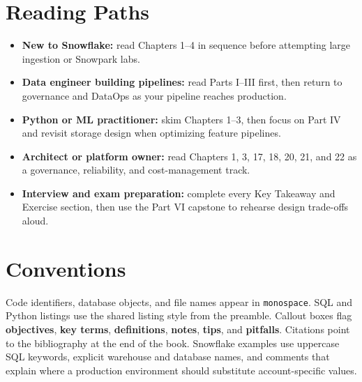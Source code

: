\section*{Reading Paths}
\begin{itemize}
    \item \textbf{New to Snowflake:} read Chapters 1--4 in sequence before attempting large ingestion or Snowpark labs.
    \item \textbf{Data engineer building pipelines:} read Parts I--III first, then return to governance and DataOps as your pipeline reaches production.
    \item \textbf{Python or ML practitioner:} skim Chapters 1--3, then focus on Part IV and revisit storage design when optimizing feature pipelines.
    \item \textbf{Architect or platform owner:} read Chapters 1, 3, 17, 18, 20, 21, and 22 as a governance, reliability, and cost-management track.
    \item \textbf{Interview and exam preparation:} complete every Key Takeaway and Exercise section, then use the Part VI capstone to rehearse design trade-offs aloud.
\end{itemize}

\section*{Conventions}
Code identifiers, database objects, and file names appear in \texttt{monospace}. SQL and Python listings use the shared listing style from the preamble. Callout boxes flag \textbf{objectives}, \textbf{key terms}, \textbf{definitions}, \textbf{notes}, \textbf{tips}, and \textbf{pitfalls}. Citations point to the bibliography at the end of the book. Snowflake examples use uppercase SQL keywords, explicit warehouse and database names, and comments that explain where a production environment should substitute account-specific values.
